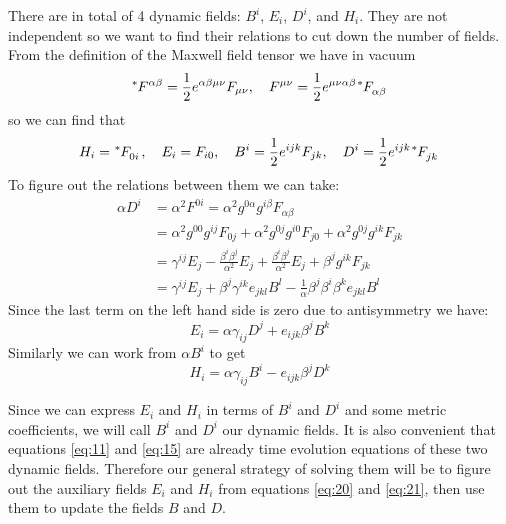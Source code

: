 There are in total of 4 dynamic fields: $B^i$, $E_i$, $D^i$, and $H_i$. They are
not independent so we want to find their relations to cut down the number of
fields. From the definition of the Maxwell field tensor we have in vacuum
\begin{equation}
  \label{eq:17}
  \tensor[^{*}]{F}{^{\alpha\beta}} = \frac{1}{2}e^{\alpha\beta\mu\nu}F_{\mu\nu}, \quad F^{\mu\nu} = \frac{1}{2}e^{\mu\nu\alpha\beta}\tensor[^{*}]{F}{_{\alpha\beta}}
\end{equation}
so we can find that
\begin{equation}
  \label{eq:18}
  H_i = \tensor[^{*}]{F}{_{0i}}, \quad E_i = F_{i0}, \quad B^i = \frac{1}{2}e^{ijk}F_{jk}, \quad D^i = \frac{1}{2}e^{ijk}\tensor[^{*}]{F}{_{jk}}
\end{equation}
To figure out the relations between them we can take:
\begin{equation}
  \label{eq:19}
  \begin{split}
  \alpha D^i &= \alpha^2F^{0i} = \alpha^2g^{0\alpha}g^{i\beta}F_{\alpha\beta} \\
             &= \alpha^2g^{00}g^{ij}F_{0j} + \alpha^2g^{0j}g^{i0}F_{j0} + \alpha^2g^{0j}g^{ik}F_{jk} \\
             &= \gamma^{ij}E_j - \frac{\beta^i\beta^j}{\alpha^2}E_j + \frac{\beta^i\beta^j}{\alpha^2}E_j + \beta^jg^{ik}F_{jk} \\
             &= \gamma^{ij}E_j + \beta^j\gamma^{ik}e_{jkl}B^l - \frac{1}{\alpha}\beta^j\beta^i\beta^ke_{jkl}B^l
  \end{split}
\end{equation}
Since the last term on the left hand side is zero due to antisymmetry we have:
\begin{equation}
  \label{eq:20}
  E_i = \alpha \gamma_{ij}D^j + e_{ijk}\beta^jB^k
\end{equation}
Similarly we can work from $\alpha B^i$ to get
\begin{equation}
  \label{eq:21}
  H_i = \alpha \gamma_{ij}B^i - e_{ijk}\beta^jD^k
\end{equation}

Since we can express $E_i$ and $H_i$ in terms of $B^i$ and $D^i$ and some metric
coefficients, we will call $B^i$ and $D^i$ our dynamic fields. It is also
convenient that equations \eqref{eq:11} and \eqref{eq:15} are already time
evolution equations of these two dynamic fields. Therefore our general strategy
of solving them will be to figure out the auxiliary fields $E_i$ and $H_i$ from
equations \eqref{eq:20} and \eqref{eq:21}, then use them to update the fields
$B$ and $D$.


